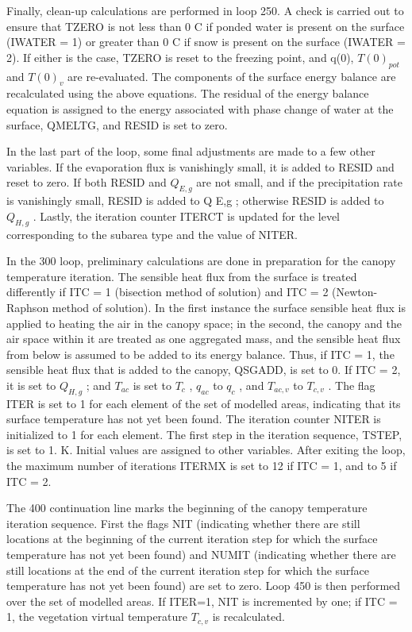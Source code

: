 Finally, clean-\/up calculations are performed in loop 250. A check is carried out to ensure that T\+Z\+E\+R\+O is not less than 0 C if ponded water is present on the surface (I\+W\+A\+T\+E\+R = 1) or greater than 0 C if snow is present on the surface (I\+W\+A\+T\+E\+R = 2). If either is the case, T\+Z\+E\+R\+O is reset to the freezing point, and q(0), $T(0)_{pot}$ and $T(0)_v$ are re-\/evaluated. The components of the surface energy balance are recalculated using the above equations. The residual of the energy balance equation is assigned to the energy associated with phase change of water at the surface, Q\+M\+E\+L\+T\+G, and R\+E\+S\+I\+D is set to zero.

In the last part of the loop, some final adjustments are made to a few other variables. If the evaporation flux is vanishingly small, it is added to R\+E\+S\+I\+D and reset to zero. If both R\+E\+S\+I\+D and $Q_{E,g}$ are not small, and if the precipitation rate is vanishingly small, R\+E\+S\+I\+D is added to Q E,g ; otherwise R\+E\+S\+I\+D is added to $Q_{H,g}$ . Lastly, the iteration counter I\+T\+E\+R\+C\+T is updated for the level corresponding to the subarea type and the value of N\+I\+T\+E\+R.

In the 300 loop, preliminary calculations are done in preparation for the canopy temperature iteration. The sensible heat flux from the surface is treated differently if I\+T\+C = 1 (bisection method of solution) and I\+T\+C = 2 (Newton-\/\+Raphson method of solution). In the first instance the surface sensible heat flux is applied to heating the air in the canopy space; in the second, the canopy and the air space within it are treated as one aggregated mass, and the sensible heat flux from below is assumed to be added to its energy balance. Thus, if I\+T\+C = 1, the sensible heat flux that is added to the canopy, Q\+S\+G\+A\+D\+D, is set to 0. If I\+T\+C = 2, it is set to $Q_{H,g}$ ; and $T_{ac}$ is set to $T_c$ , $q_{ac}$ to $q_c$ , and $T_{ac,v}$ to $T_{c,v}$ . The flag I\+T\+E\+R is set to 1 for each element of the set of modelled areas, indicating that its surface temperature has not yet been found. The iteration counter N\+I\+T\+E\+R is initialized to 1 for each element. The first step in the iteration sequence, T\+S\+T\+E\+P, is set to 1. K. Initial values are assigned to other variables. After exiting the loop, the maximum number of iterations I\+T\+E\+R\+M\+X is set to 12 if I\+T\+C = 1, and to 5 if I\+T\+C = 2.

The 400 continuation line marks the beginning of the canopy temperature iteration sequence. First the flags N\+I\+T (indicating whether there are still locations at the beginning of the current iteration step for which the surface temperature has not yet been found) and N\+U\+M\+I\+T (indicating whether there are still locations at the end of the current iteration step for which the surface temperature has not yet been found) are set to zero. Loop 450 is then performed over the set of modelled areas. If I\+T\+E\+R=1, N\+I\+T is incremented by one; if I\+T\+C = 1, the vegetation virtual temperature $T_{c,v}$ is recalculated.

